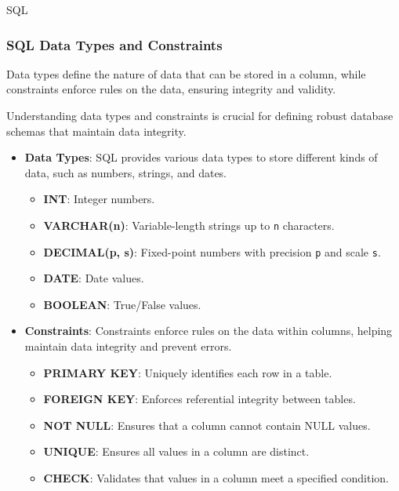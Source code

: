 \begin{notes}{SQL}
    \subsubsection*{SQL Data Types and Constraints}
    
    Data types define the nature of data that can be stored in a column, while constraints enforce rules on the data, ensuring integrity and validity.
    
    \begin{highlight}
    
        Understanding data types and constraints is crucial for defining robust database schemas that maintain data integrity.
        
        \begin{itemize}
            \item \textbf{Data Types}: SQL provides various data types to store different kinds of data, such as numbers, strings, and dates.
            \begin{itemize}
                \item \textbf{INT}: Integer numbers.
                \item \textbf{VARCHAR(n)}: Variable-length strings up to \texttt{n} characters.
                \item \textbf{DECIMAL(p, s)}: Fixed-point numbers with precision \texttt{p} and scale \texttt{s}.
                \item \textbf{DATE}: Date values.
                \item \textbf{BOOLEAN}: True/False values.
            \end{itemize}
            \item \textbf{Constraints}: Constraints enforce rules on the data within columns, helping maintain data integrity and prevent errors.
            \begin{itemize}
                \item \textbf{PRIMARY KEY}: Uniquely identifies each row in a table.
                \item \textbf{FOREIGN KEY}: Enforces referential integrity between tables.
                \item \textbf{NOT NULL}: Ensures that a column cannot contain NULL values.
                \item \textbf{UNIQUE}: Ensures all values in a column are distinct.
                \item \textbf{CHECK}: Validates that values in a column meet a specified condition.
            \end{itemize}
        \end{itemize}
    

\end{highlight}
\end{notes}
